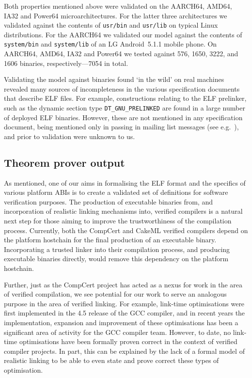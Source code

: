 Both properties mentioned above were validated on the AARCH64, AMD64, IA32 and Power64 microarchitectures.
For the latter three architectures we validated against the contents of \texttt{usr/bin} and \texttt{usr/lib} on typical Linux distributions.
For the AARCH64 we validated our model against the contents of \texttt{system/bin} and \texttt{system/lib} of an LG Android~5.1.1 mobile phone.
On AARCH64, AMD64, IA32 and Power64 we tested against 576, 1650, 3222, and 1606 binaries, respectively---7054 in total.

Validating the model against binaries found `in the wild' on real machines revealed many sources of incompleteness in the various specification documents that describe ELF files.
For example, constructions relating to the ELF prelinker, such as the dynamic section type \texttt{DT\_GNU\_PRELINKED} are found in a large number of deployed ELF binaries.
However, these are not mentioned in any specification document, being mentioned only in passing in mailing list messages (see e.g.~\cite{jelinek-prelinker-2001}), and prior to validation were unknown to us.

\subsection{Theorem prover output}
\label{subsect.theorem.prover.output}

As mentioned, one of our aims in formalising the ELF format and the specifics of various platform ABIs is to create a validated set of definitions for software verification purposes.
The production of executable binaries from, and incorporation of realistic linking mechanisms into, verified compilers is a natural next step for those aiming to improve the trustworthiness of the compilation process.
Currently, both the CompCert and CakeML verified compilers depend on the platform hostchain for the final production of an executable binary.
Incorporating a trusted linker into their compilation process, and producing executable binaries directly, would remove this dependency on the platform hostchain.

Further, just as the CompCert project has acted as a nexus for work in the area of verified compilation, we see potential for our work to serve an analogous purpose in the area of verified linking.
For example, link-time optimisations were first implemented in the 4.5 release of the GCC compiler, and in recent years the implementation, expansion and improvement of these optimisations has been a significant area of activity for the GCC compiler team.
However, to date, no link-time optimisations have been formally proven correct in the context of verified compiler projects.
In part, this can be explained by the lack of a formal model of realistic linking to be able to even state and prove correct these types of optimisation.

